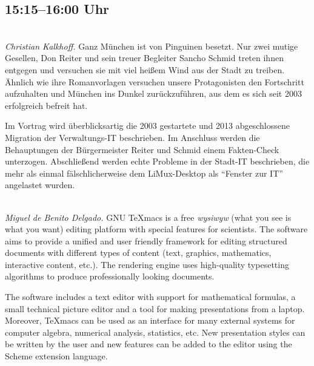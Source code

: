 \documentclass[10pt,a4paper,ngerman]{scrartcl}
\let\origdescription\description
\renewenvironment{description}{
  \setlength{\leftmargini}{0em}
  \origdescription
  \setlength{\itemindent}{0em}
  \setlength{\itemsep}{1.2em}
  \setlength{\labelsep}{\textwidth}
}
{\endlist}
\newcommand{\vorschub}{\mbox{}\\[-0.5em]}
\begin{document}
\begin{multicols*}{2}

\section{15:15--16:00 Uhr}

\begin{description}
\item[Aktuelle Entwicklungen bei LiMux]\vorschub
\textsl{Christian Kalkhoff.}
Ganz München ist von Pinguinen besetzt. Nur zwei mutige Gesellen, Don Reiter und sein treuer Begleiter Sancho Schmid treten ihnen entgegen und versuchen sie mit viel heißem Wind aus der Stadt zu treiben.
Ähnlich wie ihre Romanvorlagen versuchen unsere Protagonisten den Fortschritt aufzuhalten und München ins Dunkel zurückzuführen, aus dem es sich seit 2003 erfolgreich befreit hat.

Im Vortrag wird überblicksartig die 2003 gestartete und 2013 abgeschlossene Migration der Verwaltungs-IT beschrieben. Im Anschluss werden die Behauptungen der Bürgermeister Reiter und Schmid einem Fakten-Check unterzogen. Abschließend werden echte Probleme in der Stadt-IT beschrieben, die mehr als einmal fälschlicherweise dem LiMux-Desktop als "`Fenster zur IT"' angelastet wurden.

\item[TeXmacs, a free scientific word processor]\vorschub
\textsl{Miguel de Benito Delgado.}
GNU TeXmacs is a free \emph{wysiwyw} (what you see is what you want) editing platform with special features for scientists. The software aims to provide a unified and user friendly framework for editing structured documents with different types of content (text, graphics, mathematics, interactive content, etc.). The rendering engine uses high-quality typesetting algorithms to produce professionally looking documents.

The software includes a text editor with support for mathematical formulas, a small technical picture editor and a tool for making presentations from a laptop. Moreover, TeXmacs can be used as an interface for many external systems for computer algebra, numerical analysis, statistics, etc. New presentation styles can be written by the user and new features can be added to the editor using the Scheme extension language.



\end{description}
\end{multicols*}
\end{document}
